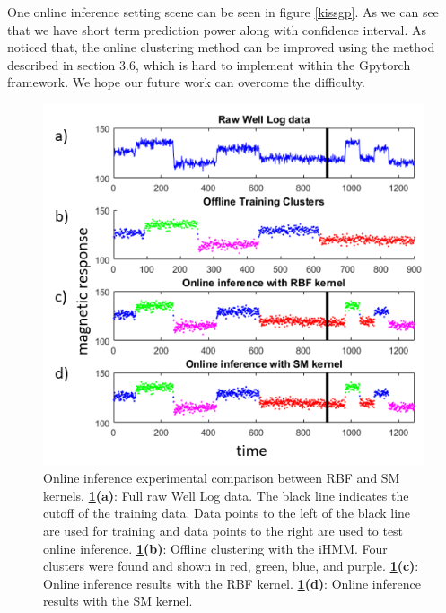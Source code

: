 \documentclass{article}
\begin{document}
One online inference setting scene can be seen in figure \ref{kissgp}. As we can see that we have short term prediction power along with confidence interval. As noticed that, the online clustering method can be improved using the method described in section 3.6, which is hard to implement within the Gpytorch framework. We hope our future work can overcome the difficulty.  

\begin{figure}[ht]
\vskip 0.2in
\begin{center}
\centerline{\includegraphics[width=\columnwidth]{OIClust}}
\caption{Online inference experimental comparison between RBF and SM kernels. \textbf{\ref{OIClust}(a)}: Full raw Well Log data. The black line indicates the cutoff of the training data. Data points to the left of the black line are used for training and data points to the right are used to test online inference. \textbf{\ref{OIClust}(b)}: Offline clustering with the iHMM. Four clusters were found and shown in red, green, blue, and purple. \textbf{\ref{OIClust}(c)}: Online inference results with the RBF kernel. \textbf{\ref{OIClust}(d)}: Online inference results with the SM kernel.}
\label{OIClust}
\end{center}
\vskip -0.2in
\end{figure} 
\end{document}
